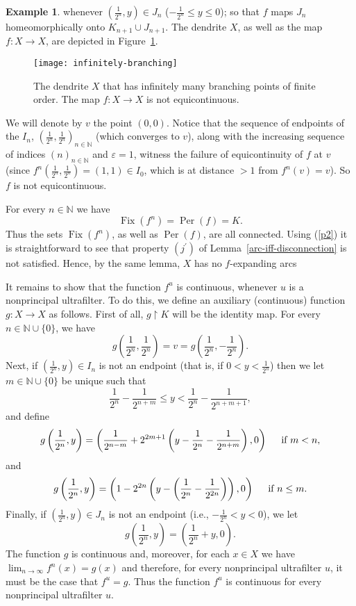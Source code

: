 \documentclass[12pt]{amsart}
\theoremstyle{definition}
\newtheorem{example}[theorem]{Example}
\numberwithin{equation}{section}
\DeclareMathOperator{\fix}{Fix}
\DeclareMathOperator{\per}{Per}
\begin{document}
\begin{example}
\noindent whenever $\left(\frac{1}{2^n},y\right)\in J_n$ ($-\frac{1}{2^n}\leq y\leq 0$); so that $f$ maps $J_n$ 
homeomorphically onto $K_{n+1}\cup J_{n+1}$. The dendrite $X$, as well as the map $f:X\longrightarrow X$, 
are depicted in Figure~\ref{infinitely-branching}.

\begin{figure}[t]
\centering
\texttt{[image: infinitely-branching]}
\caption{The dendrite $X$ that has infinitely many branching points of finite order. The map 
$f \colon X\longrightarrow X$ is not equicontinuous.}
\label{infinitely-branching}
\end{figure}

We will denote by $v$ the point $(0,0)$. Notice that the sequence of endpoints of the $I_n$, 
$\left(\frac{1}{2^n},\frac{1}{2^n}\right)_{n\in\mathbb N}$ (which converges to $v$), along with the increasing 
sequence of indices $(n)_{n\in\mathbb N}$ and $\varepsilon=1$, witness the failure of equicontinuity of $f$ at $v$ (since $f^n\left(\frac{1}{2^n},\frac{1}{2^n}\right)=(1,1)\in I_0$, which is at distance $>1$ from $f^n(v)=v$). So $f$ 
is not equicontinuous.

For every $n\in\mathbb N$ we have 
\begin{equation}\label{p2}
\fix(f^n)=\per(f)=K.
\end{equation}
Thus the sets $\fix(f^n)$, as well as $\per(f)$, are all connected. Using (\ref{p2}) it is straightforward to see that property $(j^\prime)$ of Lemma~\ref{arc-iff-disconnection} is not satisfied. Hence, by the same lemma, $X$ has no $f$-expanding arcs

It remains to show that the function $f^u$ is continuous, whenever $u$ is a nonprincipal ultrafilter. To do this, we define an auxiliary (continuous) function $g \colon X\longrightarrow X$ as follows. First of all, $g\upharpoonright K$ will be the identity map. For every $n\in\mathbb N\cup\{0\}$, we have 
$$
g\left(\frac{1}{2^n},\frac{1}{2^n}\right)=v= g\left(\frac{1}{2^n},-\frac{1}{2^n}\right).
$$ 
Next, if $\left(\frac{1}{2^n},y\right)\in I_n$ is not an endpoint (that is, if $0<y<\frac{1}{2^n}$) then we let 
$m\in\mathbb N\cup\{0\}$ be unique such that 
$$
\frac{1}{2^n}-\frac{1}{2^{n+m}}\leq y<\frac{1}{2^n}-\frac{1}{2^{n+m+1}},
$$ 
\noindent and define
$$
g\left(\frac{1}{2^n},y\right)=\left(\frac{1}{2^{n-m}}+2^{2m+1}\left(y-\frac{1}{2^n}-\frac{1}{2^{n+m}}\right),0\right)
\hspace{.5cm} \mbox{if } m < n,
$$ 
\noindent and 
$$
g\left(\frac{1}{2^n},y\right)=\left(1-2^{2n}\left(y-\left(\frac{1}{2^n}-\frac{1}{2^{2n}}\right)\right),0\right)
  \hspace{.5cm} \mbox{if } n \leq m.
$$ 
Finally, if $\left(\frac{1}{2^n},y\right)\in J_n$ is not an endpoint (i.e., $-\frac{1}{2^n}<y<0$), we let 
$$
g\left(\frac{1}{2^n},y\right)=\left(\frac{1}{2^n}+y,0\right).
$$ 
The function $g$ is continuous and, moreover, for each $x\in X$ we have $\lim_{n\to\infty}f^n(x)=g(x)$ and therefore, for every nonprincipal ultrafilter $u$, it must be the case that $f^u=g$. Thus the function $f^u$ is continuous for 
every nonprincipal ultrafilter $u$.
\end{example}
\end{document}
